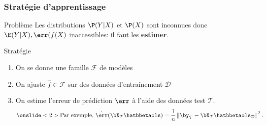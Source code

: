 \documentclass{beamer}\usepackage[]{graphicx}\usepackage[]{color}
\begin{document}
\begin{frame}
  \frametitle{Stratégie d'apprentissage}

  \begin{block}{Problème}
    Les  distributions  $\P(Y|X)$  et   $\P(X)$  sont  inconnues  donc
    $\E(Y|X), \err(f(X)$ inaccessibles: il faut les \alert{\bf estimer}.
  \end{block}

  \vfill

  \begin{block}{Stratégie}
    \begin{enumerate}
    \item On se donne une famille $\mathcal{F}$ de modèles\\ 
      \bigskip
    \item   On   ajuste   $\hat{f}\in\mathcal{F}$  sur   des   données
      d'entraînement $\mathcal{D}$\\ 
      \bigskip
    \item On estime l'erreur de prédiction $\err$  à l'aide des données test $\mathcal{T}$.
       \begin{equation*}
         \onslide<2>{\text{Par exemple, }\hat{\err}(\bX_{\mathcal{T}}\hatbbetaols) = \frac{1}{n} \left\|
         \by_{\mathcal{T}}- \bX_{\mathcal{T}} \hatbbetaols_{\mathcal{D}}\right\|^2.}
       \end{equation*}
    \end{enumerate}
  \end{block}
\end{frame}
\end{document}
